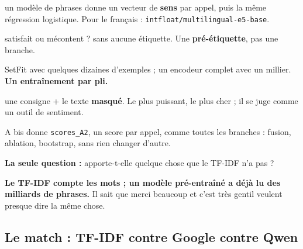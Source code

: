 \begin{tcbraster}[raster columns=2, raster equal height, raster column skip=8pt]
\begin{kpibox}[title={1. Plongements gelés (exercice 10.3)}, unbreakable]
\small un modèle de phrases donne un vecteur de \textbf{sens} par appel, puis la même régression
logistique. Pour le français : \texttt{intfloat/multilingual-e5-base}.
\end{kpibox}
\begin{kpibox}[title={2. Zéro-coup}, unbreakable]
\small \og satisfait \fg{} ou \og mécontent \fg{} ? sans aucune étiquette. Une \textbf{pré-étiquette},
pas une branche.
\end{kpibox}
\begin{kpibox}[title={3. Affinage}, unbreakable]
\small SetFit avec quelques dizaines d'exemples ; un encodeur complet avec un millier. \textbf{Un
entraînement par pli.}
\end{kpibox}
\begin{kpibox}[title={4. Grand modèle de langue}, unbreakable]
\small une consigne + le texte \textbf{masqué}. Le plus puissant, le plus cher ; il se juge comme un outil
de sentiment.
\end{kpibox}
\end{tcbraster}

\begin{stepbox}[title={\faPlug\quad La brancher}]
A bis donne \texttt{scores\_A2}, un score par appel, comme toutes les branches : fusion, ablation,
bootstrap, sans rien changer d'autre.\par\smallskip
\textbf{La seule question :} apporte-t-elle quelque chose que le TF-IDF n'a pas ?
\end{stepbox}

\begin{enfant}
\textbf{Le TF-IDF compte les mots ; un modèle pré-entraîné a déjà lu des milliards de phrases.} Il sait
que \og merci beaucoup \fg{} et \og c'est très gentil \fg{} veulent presque dire la même chose.
\end{enfant}

\subsection*{Le match : TF-IDF contre Google contre Qwen}

